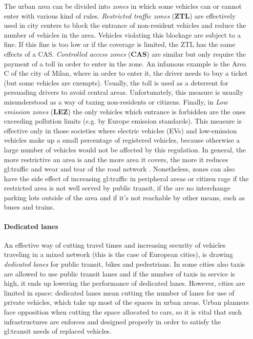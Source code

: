 The urban area can be divided into \textit{zones} in which some vehicles can or cannot enter with various kind of rules.
\textit{Restricted traffic zones} (\textbf{ZTL}) are effectively used in city centers to block the entrance of non-resident vehicles and reduce the number of vehicles in the area. Vehicles violating this blockage are subject to a fine. If this fine is too low or if the coverage is limited, the ZTL has the same effects of a CAS.
\textit{Controlled access zones} (\textbf{CAS}) are similar but only require the payment of a toll in order to enter in the zone. An infamous example is the Area C of the city of Milan, where in order to enter it, the driver needs to buy a ticket (but some vehicles are exempts). Usually, the toll is used as a deterrent for persuading drivers to avoid central areas. Unfortunately, this measure is usually misunderstood as a way of taxing non-residents or citizens.
Finally, in \textit{Low emission zones} (\textbf{LEZ}) the only vehicles which entrance is forbidden are the ones exceeding pollution limits (e.g. by Europe emission standards). This measure is effective only in those societies where electric vehicles (EVs) and low-emission vehicles make up a small percentage of registered vehicles, because otherwise a large number of vehicles would not be affected by this regulation.
In general, the more restrictive an area is and the more area it covers, the more it reduces \gls{gl:traffic} and wear and tear of the road network \cite{derobertis2016traffic}. Nonetheless, zones can also have the side effect of increasing \gls{gl:traffic} in peripheral areas or citizen rage if the restricted area is not well served by public transit, if the are no interchange parking lots outside of the area and if it's not reachable by other means, such as buses and trains.

\paragraph{Dedicated lanes}

An effective way of cutting travel times and increasing security of vehicles traveling in a mixed network (this is the case of European cities), is drawing \textit{dedicated lanes} for public transit, bikes and pedestrians. In some cities also taxis are allowed to use public transit lanes and if the number of taxis in service is high, it ends up lowering the performance of dedicated lanes. However, cities are limited in space: dedicated lanes mean cutting the number of lanes for use of private vehicles, which take up most of the spaces in urban areas. Urban planners face opposition when cutting the space allocated to cars, so it is vital that such infrastructures are enforces and designed properly in order to satisfy the \gls{gl:transit} needs of replaced vehicles.

